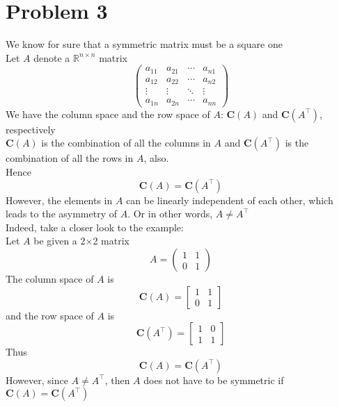 \documentclass[11pt]{article}
\begin{document}
\section*{Problem 3}
We know for sure that a symmetric matrix must be a square one\\[0.2cm]
Let $A$ denote a $\mathbb{R}^{n\times n}$ matrix
$$ 
 \begin{pmatrix}
  a_{11} & a_{21} & \cdots & a_{n1} \\
  a_{12} & a_{22} & \cdots & a_{n2} \\
  \vdots  & \vdots  & \ddots & \vdots  \\
  a_{1n} & a_{2n} & \cdots & a_{nn} 
 \end{pmatrix}
$$
We have the column space and the row space of $A$: $\textbf{C}(A)$ and $\textbf{C}(A^\top)$, respectively\\[0.2cm]
$\textbf{C}(A)$ is the combination of all the columns in $A$ and $\textbf{C}(A^\top)$ is the combination of all the rows in $A$, also.\\[0.2cm]
Hence
$$
\textbf{C}(A) = \textbf{C}(A^\top)
$$
However, the elements in $A$ can be linearly independent of each other, which leads to the asymmetry of $A$. Or in other words, $A \neq A^\top$\\[0.2cm]
Indeed, take a closer look to the example:\\[0.2cm]
Let $A$ be given a 2$\times$2 matrix
$$ A =
\begin{pmatrix}
1 & 1 \\ 0 & 1
\end{pmatrix}
$$
The column space of $A$ is
$$
\textbf{C}(A) = \begin{bmatrix} 1 & 1 \\ 0 & 1 \end{bmatrix} 
$$
and the row space of $A$ is
$$
\textbf{C}(A^\top) = \begin{bmatrix} 1 & 0 \\ 1 & 1 \end{bmatrix}
$$
Thus
$$
\textbf{C}(A) = \textbf{C}(A^\top)
$$
However, since $A \neq A^\top$, then $A$ does not have to be symmetric if $\textbf{C}(A) = \textbf{C}(A^\top)$
\end{document}
